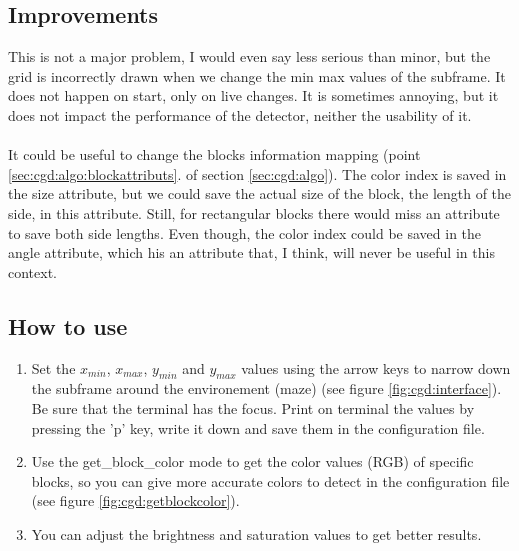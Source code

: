 \subsection{Improvements}
\label{sec:cgd:improvements}

This is not a major problem, I would even say less serious than 
minor, but the grid is incorrectly drawn when we change the 
min max values of the subframe. It does not happen on start, 
only on live changes. It is sometimes annoying, but it does not 
impact the performance of the detector, neither the usability of it.
\\
\\
It could be useful to change the blocks information mapping 
(point \ref{sec:cgd:algo:blockattributs}. of 
section \ref{sec:cgd:algo}). The color 
index is saved in the size attribute, but we could save the 
actual size of the block, the length of the side, in this attribute. 
Still, for rectangular blocks there would miss an attribute to save 
both side lengths. Even though, the color index could be saved in the 
angle attribute, which his an attribute that,
I think, will never be useful in this context. 

\subsection{How to use}
\label{sec:cgd:howto}
    \begin{enumerate}
        \item Set the $x_{min}$, $x_{max}$, $y_{min}$ and $y_{max}$ 
            values using the arrow keys
            to narrow down the subframe around the environement (maze)
            (see figure \ref{fig:cgd:interface}). Be sure 
            that the terminal has the focus. Print on terminal the values
            by pressing the 'p' key, 
            write it down and save them in the configuration file.
        \item Use the get\_block\_color mode to get the color values (RGB) 
            of specific blocks, so you can give more accurate colors to 
            detect in the configuration file (see 
            figure \ref{fig:cgd:getblockcolor}).
        \item You can adjust the brightness and saturation values to get 
            better results.
    \end{enumerate}

